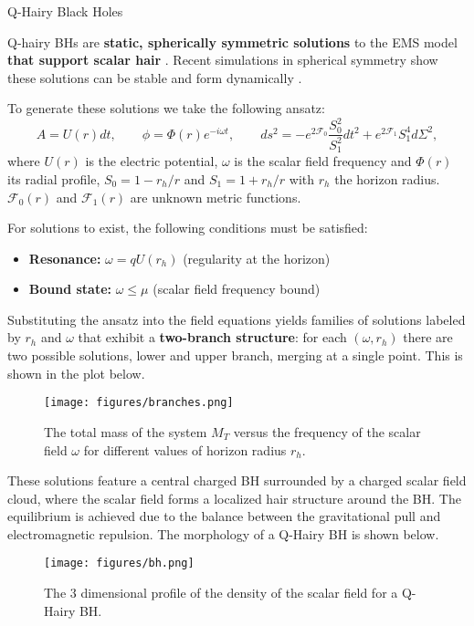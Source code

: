 \begin{block}{Q-Hairy Black Holes}

Q-hairy \glspl{BH} are \textbf{static, spherically symmetric solutions} to the \gls{EMS} model \textbf{that support scalar hair} \cite{Herdeiro2020}. Recent simulations in spherical symmetry show these solutions can be stable and form dynamically \cite{Zhang2023}.

To generate these solutions we take the following ansatz:
%
\begin{equation}
    A = U(r) dt, \qquad \phi = \Phi(r) e^{-i \omega t}, \qquad ds^2 = -e^{2\mathcal{F}_0} \frac{S_0^2}{S_1^2} dt^2 + e^{2\mathcal{F}_1} S_1^4 d\Sigma^2,
\end{equation}
%
where $U(r)$ is the electric potential, $\omega$ is the scalar field frequency and $\Phi(r)$ its radial profile, $S_0 = 1 - r_h/r$ and $S_1 = 1 + r_h/r$ with $r_h$ the horizon radius. $\mathcal{F}_0(r)$ and $\mathcal{F}_1(r)$ are unknown metric functions.

For solutions to exist, the following conditions must be satisfied:
\begin{itemize}
    \item \textbf{Resonance:} $\omega = q U(r_h)$ (regularity at the horizon)
    \item \textbf{Bound state:} $\omega \leq \mu$ (scalar field frequency bound)
\end{itemize}

Substituting the ansatz into the field equations yields families of solutions labeled by $r_h$ and $\omega$ that exhibit a \textbf{two-branch structure}: for each $(\omega, r_h)$ there are two possible solutions, lower and upper branch, merging at a single point. This is shown in the plot below.

\begin{figure}[h!]
    \centering
    \texttt{[image: figures/branches.png]}
    \caption{The total mass of the system $M_T$ versus the frequency of the scalar field $\omega$ for different values of horizon radius $r_h$.}
\end{figure}

These solutions feature a central charged \gls{BH} surrounded by a charged scalar field cloud, where the scalar field forms a localized hair structure around the \gls{BH}. The equilibrium is achieved due to the balance between the gravitational pull and electromagnetic repulsion. The morphology of a Q-Hairy \gls{BH} is shown below.

\begin{figure}[h!]
    \centering
    \texttt{[image: figures/bh.png]}
    \caption{The 3 dimensional profile of the density of the scalar field for a Q-Hairy \gls{BH}.}
\end{figure}

\end{block}
